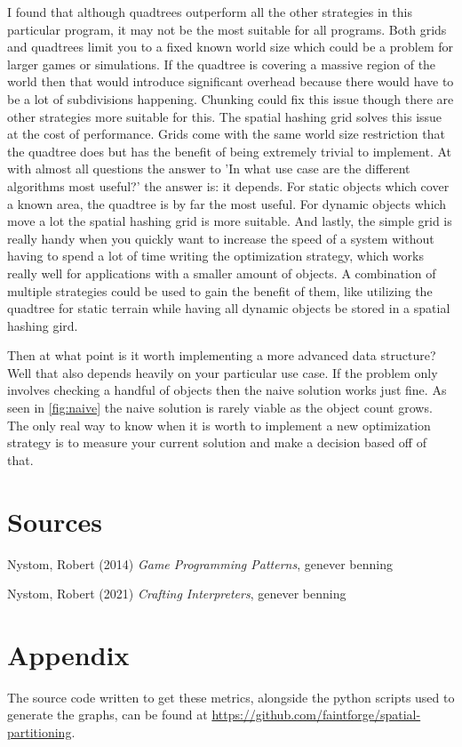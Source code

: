 \documentclass[a4paper, 12pt]{article}
\begin{document}
I found that although quadtrees outperform all the other strategies in this
particular program, it may not be the most suitable for all programs. Both grids
and quadtrees limit you to a fixed known world size which could be a problem for
larger games or simulations. If the quadtree is covering a massive region of the
world then that would introduce significant overhead because there would have to
be a lot of subdivisions happening. Chunking could fix this issue though there
are other strategies more suitable for this. The spatial hashing grid solves
this issue at the cost of performance. Grids come with the same world size
restriction that the quadtree does but has the benefit of being extremely
trivial to implement. At with almost all questions the answer to 'In what use
case are the different algorithms most useful?' the answer is: it depends. For
static objects which cover a known area, the quadtree is by far the most useful.
For dynamic objects which move a lot the spatial hashing grid is more suitable.
And lastly, the simple grid is really handy when you quickly want to increase
the speed of a system without having to spend a lot of time writing the
optimization strategy, which works really well for applications with a smaller
amount of objects. A combination of multiple strategies could be used to gain
the benefit of them, like utilizing the quadtree for static terrain while having
all dynamic objects be stored in a spatial hashing gird.

Then at what point is it worth implementing a more advanced data structure? Well
that also depends heavily on your particular use case. If the problem only
involves checking a handful of objects then the naive solution works just fine.
As seen in \ref{fig:naive} the naive solution is rarely viable as the object
count grows. The only real way to know when it is worth to implement a new
optimization strategy is to measure your current solution and make a decision
based off of that.

\section{Sources}
Nystom, Robert (2014) \textit{Game Programming Patterns}, genever benning

Nystom, Robert (2021) \textit{Crafting Interpreters}, genever benning

\section{Appendix}
The source code written to get these metrics, alongside the python scripts used
to generate the graphs, can be found at
\url{https://github.com/faintforge/spatial-partitioning}.
\end{document}
